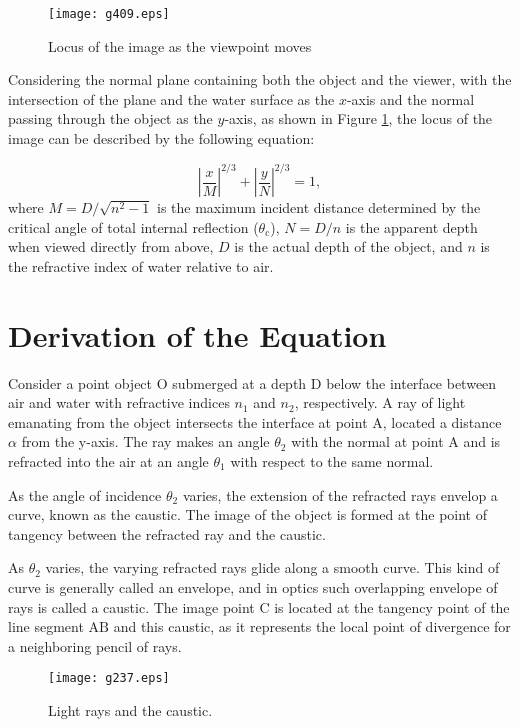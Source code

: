 \documentclass[twocolumn]{article}
\begin{document}
\begin{figure}
	\centering
	\texttt{[image: g409.eps]}
	\caption{Locus of the image as the viewpoint moves}
	\label{fig:caustic}
\end{figure}

Considering the normal plane containing both the object and the viewer, with the intersection of the plane and the water surface as the $x$-axis and the normal passing through the object as the $y$-axis, as shown in Figure \ref{fig:caustic}, the locus of the image can be described by the following equation:

$$ \left| \dfrac{x}{M} \right| ^ {2/3} + \left| \dfrac{y}{N} \right| ^ {2/3} = 1,$$
where $M = D/\sqrt{n^2 - 1}$ is the maximum incident distance determined by the critical angle of total internal reflection ($\theta_{\mathrm{c}}$), $N = D/n$ is the apparent depth when viewed directly from above, $D$ is the actual depth of the object, and $n$ is the refractive index of water relative to air.

\section{Derivation of the Equation}

Consider a point object O submerged at a depth D below the interface between air and water with refractive indices $n_1$ and $n_2$, respectively. A ray of light emanating from the object intersects the interface at point A, located a distance $\alpha$ from the y-axis. The ray makes an angle $\theta_2$ with the normal at point A and is refracted into the air at an angle $\theta_1$ with respect to the same normal.

As the angle of incidence $\theta_2$ varies, the extension of the refracted rays envelop a curve, known as the caustic. The image of the object is formed at the point of tangency between the refracted ray and the caustic.

As $\theta_2$ varies, the varying refracted rays glide along a smooth curve. This kind of curve is generally called an envelope, and in optics such overlapping envelope of rays is called a caustic.
The image point $\mathrm{C}$ is located at the tangency point of the line segment ${\mathrm{AB}}$ and this caustic, as it represents the local point of divergence for a neighboring pencil of rays.

\begin{figure}
	\centering
	\texttt{[image: g237.eps]}
	\caption{Light rays and the caustic.}
	\label{fig:geometry}
\end{figure}
\end{document}
